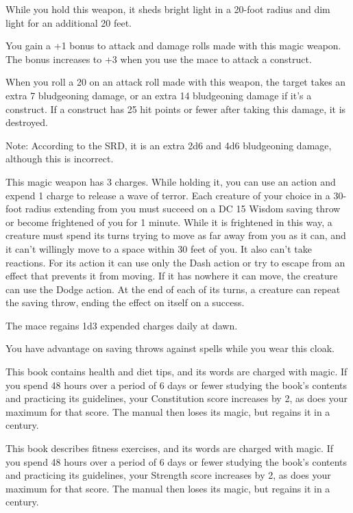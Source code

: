 \documentclass[10pt,a4paper,twoside,bg=print,twocolumn,openany,nodeprecatedcode]{dndbook}
\begin{document}
While you hold this weapon, it sheds bright light in a 20-foot radius and dim light for an additional 20 feet.

You gain a +1 bonus to attack and damage rolls made with this magic weapon. The bonus increases to +3 when you use the mace to attack a construct.

When you roll a 20 on an attack roll made with this weapon, the target takes an extra 7 bludgeoning damage, or an extra 14 bludgeoning damage if it's a construct. If a construct has 25 hit points or fewer after taking this damage, it is destroyed.

Note: According to the SRD, it is an extra 2d6 and 4d6 bludgeoning damage, although this is incorrect.

This magic weapon has 3 charges. While holding it, you can use an action and expend 1 charge to release a wave of terror. Each creature of your choice in a 30-foot radius extending from you must succeed on a DC 15 Wisdom saving throw or become frightened of you for 1 minute. While it is frightened in this way, a creature must spend its turns trying to move as far away from you as it can, and it can't willingly move to a space within 30 feet of you. It also can't take reactions. For its action it can use only the Dash action or try to escape from an effect that prevents it from moving. If it has nowhere it can move, the creature can use the Dodge action. At the end of each of its turns, a creature can repeat the saving throw, ending the effect on itself on a success.

The mace regains 1d3 expended charges daily at dawn.

You have advantage on saving throws against spells while you wear this cloak.

This book contains health and diet tips, and its words are charged with magic. If you spend 48 hours over a period of 6 days or fewer studying the book's contents and practicing its guidelines, your Constitution score increases by 2, as does your maximum for that score. The manual then loses its magic, but regains it in a century.

This book describes fitness exercises, and its words are charged with magic. If you spend 48 hours over a period of 6 days or fewer studying the book's contents and practicing its guidelines, your Strength score increases by 2, as does your maximum for that score. The manual then loses its magic, but regains it in a century.
\end{document}
